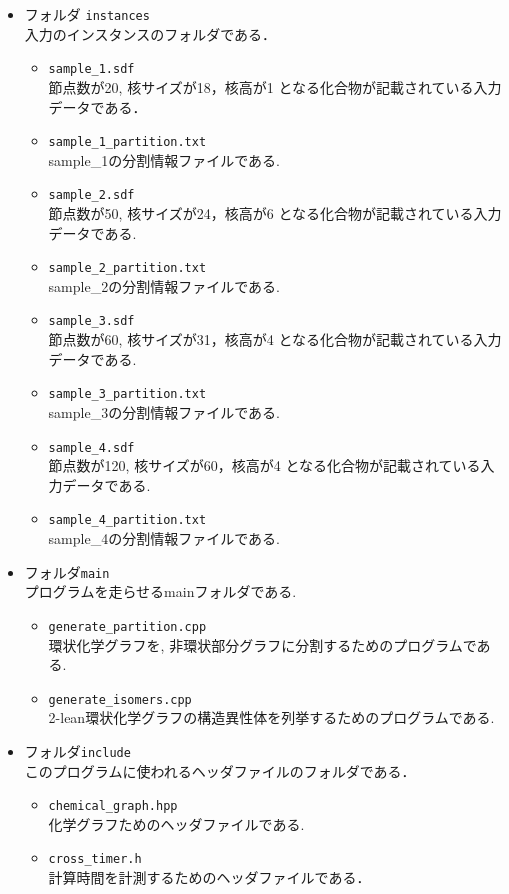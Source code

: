\documentclass[11pt,titlepage,dvipdfmx,twoside]{jarticle}
\begin{document}
\begin{itemize}
\begin{itemize}
\item フォルダ {\tt instances}\\
	入力のインスタンスのフォルダである．
	\begin{itemize}
		\item{\tt sample\_1.sdf}\\
			節点数が20, 核サイズが18，核高が1
			となる化合物が記載されている入力データである．
		\item{\tt sample\_1\_partition.txt}\\
			sample\_1の分割情報ファイルである.
			\item{\tt sample\_2.sdf}\\
			節点数が50, 核サイズが24，核高が6
			となる化合物が記載されている入力データである.
		\item{\tt sample\_2\_partition.txt}\\
		sample\_2の分割情報ファイルである.
		\item{\tt sample\_3.sdf}\\
		節点数が60, 核サイズが31，核高が4
		となる化合物が記載されている入力データである.
		\item{\tt sample\_3\_partition.txt}\\
		sample\_3の分割情報ファイルである.
		\item{\tt sample\_4.sdf}\\
		節点数が120, 核サイズが60，核高が4
		となる化合物が記載されている入力データである.
		\item{\tt sample\_4\_partition.txt}\\
		sample\_4の分割情報ファイルである.
      \end{itemize}
\item フォルダ{\tt main}\\
	プログラムを走らせるmainフォルダである.
	\begin{itemize}
		\item{\tt generate\_partition.cpp}\\
			環状化学グラフを, 非環状部分グラフに分割するためのプログラムである.
		\item{\tt generate\_isomers.cpp}\\
			2-lean環状化学グラフの構造異性体を列挙するためのプログラムである.
	\end{itemize}
	
\item フォルダ{\tt include}\\
	このプログラムに使われるヘッダファイルのフォルダである．
	\begin{itemize}
		\item{\tt chemical\_graph.hpp}\\
		  化学グラフためのヘッダファイルである.
		\item{\tt cross\_timer.h}\\
			計算時間を計測するためのヘッダファイルである．
			

\end{itemize}
\end{itemize}
\end{itemize}
\end{document}
